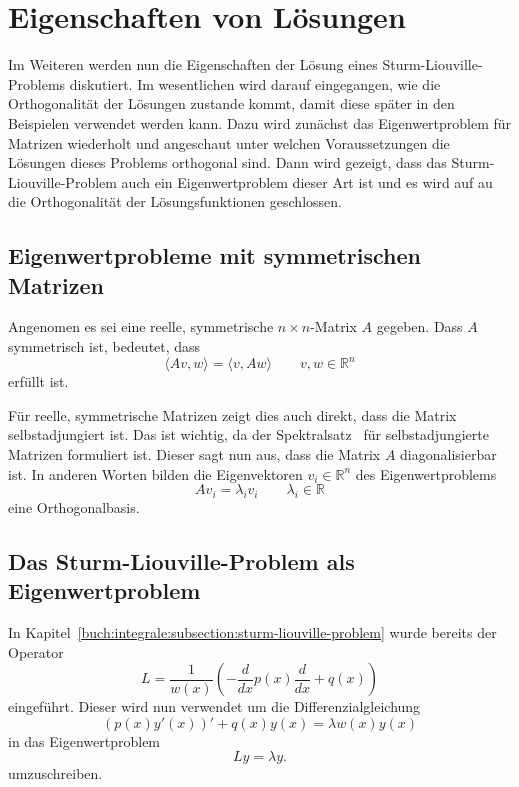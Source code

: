 %
%
%

\section{Eigenschaften von Lösungen
\label{sturmliouville:sec:solution-properties}}

Im Weiteren werden nun die Eigenschaften der Lösung eines
Sturm-Liouville-Problems diskutiert.
Im wesentlichen wird darauf eingegangen, wie die Orthogonalität der Lösungen
zustande kommt, damit diese später in den Beispielen verwendet werden kann.
Dazu wird zunächst das Eigenwertproblem für Matrizen wiederholt und angeschaut
unter welchen Voraussetzungen die Lösungen dieses Problems orthogonal sind.
Dann wird gezeigt, dass das Sturm-Liouville-Problem auch ein Eigenwertproblem
dieser Art ist und es wird auf au die Orthogonalität der Lösungsfunktionen
geschlossen.

\subsection{Eigenwertprobleme mit symmetrischen Matrizen
\label{sturmliouville:sec:eigenvalue-problem-matrix}}


Angenomen es sei eine reelle, symmetrische $n \times n$-Matrix $A$ gegeben.
Dass $A$ symmetrisch ist, bedeutet, dass
\[
    \langle Av, w \rangle
    =
    \langle v, Aw \rangle
    \qquad
    v, w \in \mathbb{R}^n
\]
erfüllt ist.

Für reelle, symmetrische Matrizen zeigt dies auch direkt, dass die Matrix
selbstadjungiert ist.
Das ist wichtig, da der Spektralsatz~\cite{sturmliouville:spektralsatz-wiki}
für selbstadjungierte Matrizen formuliert ist. Dieser sagt nun aus, dass die
Matrix $A$ diagonalisierbar ist.
In anderen Worten bilden die Eigenvektoren $v_i \in \mathbb{R}^n$ des 
Eigenwertproblems
\[
    A v_i
    =
    \lambda_i v_i
    \qquad \lambda_i \in \mathbb{R}
\]
eine Orthogonalbasis.

\subsection{Das Sturm-Liouville-Problem als Eigenwertproblem}

In Kapitel~\ref{buch:integrale:subsection:sturm-liouville-problem} wurde bereits
der Operator
\[
    L
    =
    \frac{1}{w(x)}\left( -\frac{d}{dx}p(x) \frac{d}{dx} + q(x)\right)
\]
eingeführt.
Dieser wird nun verwendet um die Differenzialgleichung 
\[
    (p(x)y'(x))' + q(x)y(x)
    =
    \lambda w(x) y(x)
\]
in das Eigenwertproblem
\begin{equation}
    \label{sturmliouville:eq:eigenvalue-problem}
    L y
    =
    \lambda y.
\end{equation}
umzuschreiben.

